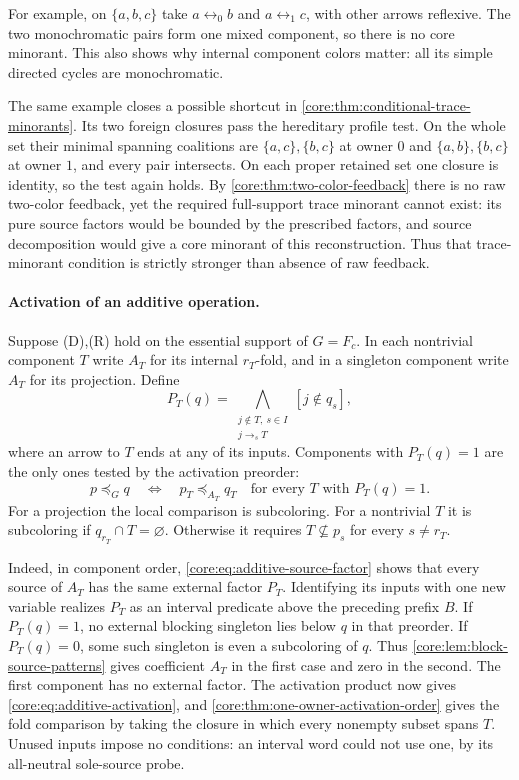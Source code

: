 For example, on $\{a,b,c\}$ take $a\leftrightarrow_0 b$ and
$a\leftrightarrow_1 c$, with other arrows reflexive. The two
monochromatic pairs form one mixed component, so there is no core
minorant. This also shows why internal component colors matter:
all its simple directed cycles are monochromatic.

The same example closes a possible shortcut in
\cref{core:thm:conditional-trace-minorants}. Its two foreign closures
pass the hereditary profile test. On the whole set their minimal
spanning coalitions are $\{a,c\},\{b,c\}$ at owner $0$ and
$\{a,b\},\{b,c\}$ at owner $1$, and every pair intersects.
On each proper retained set one closure
is identity, so the test again holds. By
\cref{core:thm:two-color-feedback} there is no raw two-color feedback,
yet the required full-support trace minorant cannot exist: its pure
source factors would be bounded by the prescribed factors, and source
decomposition would give a core minorant of this reconstruction. Thus that
trace-minorant condition is strictly stronger than absence of raw
feedback.

\paragraph{Activation of an additive operation.}
Suppose (D),(R) hold on the essential support of $G=F_c$. In each
nontrivial component $T$ write $A_T$ for its internal $r_T$-fold,
and in a singleton component write $A_T$ for its projection. Define
\[
 P_T(q)=\bigwedge_{\substack{j\notin T,\ s\in I\\ j\to_s T}}
                       [j\notin q_s],
\]
where an arrow to $T$ ends at any of its inputs. Components with
$P_T(q)=1$ are the only ones tested by the activation preorder:
\begin{equation}\label{core:eq:additive-activation}
  p\preceq_G q
  \quad\Longleftrightarrow\quad
  p_T\preceq_{A_T}q_T\quad\text{for every }T\text{ with }P_T(q)=1.
\end{equation}
For a projection the local comparison is subcoloring. For a nontrivial
$T$ it is subcoloring if $q_{r_T}\cap T=\varnothing$. Otherwise it
requires $T\not\subseteq p_s$ for every $s\ne r_T$.

Indeed, in component order, \eqref{core:eq:additive-source-factor}
shows that every source of $A_T$ has the same external factor $P_T$.
Identifying its inputs with one new variable realizes $P_T$ as an
interval predicate above the preceding prefix $B$. If $P_T(q)=1$,
no external blocking singleton lies below $q$ in that preorder.
If $P_T(q)=0$, some such singleton is even a subcoloring of $q$.
Thus \cref{core:lem:block-source-patterns} gives coefficient $A_T$
in the first case and zero in the second. The first component has
no external factor. The activation product now gives
\eqref{core:eq:additive-activation}, and
\cref{core:thm:one-owner-activation-order} gives the fold comparison
by taking the closure in which every nonempty subset spans $T$.
Unused inputs impose no conditions: an interval word could not use
one, by its all-neutral sole-source probe.

